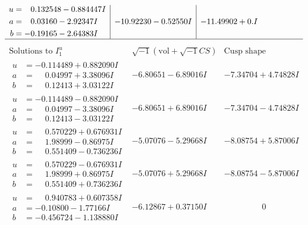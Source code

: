 \documentclass[1p]{elsarticle_modified}
\theoremstyle{definition}
\newcommand{\I}{\sqrt{-1}}
\begin{document}
$$\begin{array}{c|c|c}
\begin{aligned}
u &= \phantom{-}0.132548 - 0.884447 I \\
a &= \phantom{-}0.03160 - 2.92347 I \\
b &= -0.19165 - 2.64383 I\end{aligned}
 & -10.92230 - 0.52550 I & -11.49902 + 0. I\phantom{ +0.000000I}\\
 \hline 
 \end{array}$$\newpage$$\begin{array}{c|c|c}  
\text{Solutions to }I^u_{1}& \I (\text{vol} + \sqrt{-1}CS) & \text{Cusp shape}\\
 \hline 
\begin{aligned}
u &= -0.114489 + 0.882090 I \\
a &= \phantom{-}0.04997 + 3.38096 I \\
b &= \phantom{-}0.12413 + 3.03122 I\end{aligned}
 & -6.80651 - 6.89016 I & -7.34704 + 4.74828 I \\ \hline\begin{aligned}
u &= -0.114489 - 0.882090 I \\
a &= \phantom{-}0.04997 - 3.38096 I \\
b &= \phantom{-}0.12413 - 3.03122 I\end{aligned}
 & -6.80651 + 6.89016 I & -7.34704 - 4.74828 I \\ \hline\begin{aligned}
u &= \phantom{-}0.570229 + 0.676931 I \\
a &= \phantom{-}1.98999 - 0.86975 I \\
b &= \phantom{-}0.551409 - 0.736236 I\end{aligned}
 & -5.07076 - 5.29668 I & -8.08754 + 5.87006 I \\ \hline\begin{aligned}
u &= \phantom{-}0.570229 - 0.676931 I \\
a &= \phantom{-}1.98999 + 0.86975 I \\
b &= \phantom{-}0.551409 + 0.736236 I\end{aligned}
 & -5.07076 + 5.29668 I & -8.08754 - 5.87006 I \\ \hline\begin{aligned}
u &= \phantom{-}0.940783 + 0.607358 I \\
a &= -0.10800 - 1.77166 I \\
b &= -0.456724 - 1.138880 I\end{aligned}
 & -6.12867 + 0.37150 I & \phantom{-0.000000 } 0 \\ \hline\begin{aligned}

\end{aligned}
\end{array}$$
\end{document}
